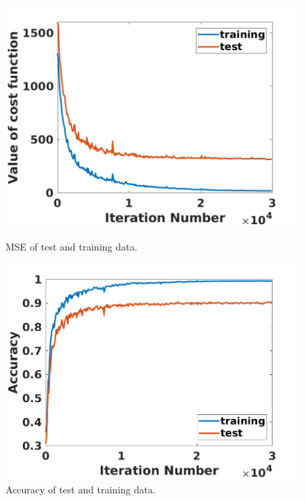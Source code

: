 \begin{figure}[H]
    \centering
    \begin{minipage}{0.45\textwidth}
        \includegraphics[width = \textwidth]{images/nn/mse_data.png}
        \caption{MSE of test and training data.}\label{fig:mse_data}
    \end{minipage}
    \hspace{2em}
    \begin{minipage}{0.45\textwidth}
        \includegraphics[width = \textwidth]{images/nn/acc_data.png}
        \caption{Accuracy of test and training data.}\label{fig:acc_data}
    \end{minipage}
\end{figure}

